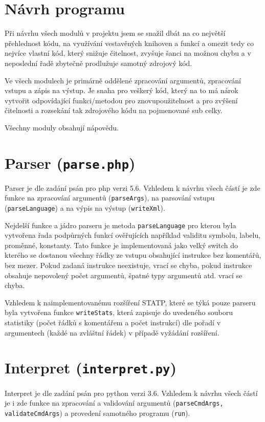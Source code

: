 \documentclass[a4paper,10pt]{article}
\begin{document}
\hfill

\section*{Návrh programu}
  Při návrhu všech modulů v projektu jsem se snažil dbát na co největší přehlednost kódu, na
  využívání vestavěných knihoven a funkcí a omezit tedy co nejvíce vlastní kód, který snižuje
  čitelnost, zvyšuje šanci na možnou chybu a v neposlední řadě zbytečně prodlužuje samotný zdrojový kód.

  Ve všech modulech je primárně oddělené zpracování argumentů, zpracování vstupu a zápis na výstup.
  Je snaha pro veškerý kód, který na to má nárok vytvořit odpovídající funkci/metodou pro
  znovupoužitelnost a pro zvýšení čitelnosti a rozsekání tak zdrojového kódu na pojmenované sub celky.

  Všechny moduly obsahují nápovědu.

\section{Parser (\texttt{parse.php})}
  Parser je dle zadání psán pro php verzi 5.6. Vzhledem k návrhu všech částí je zde funkce na zpracování argumentů (\texttt{parseArgs}), na parsování vstupu (\texttt{parseLanguage}) a na výpis na výstup (\texttt{writeXml}).

  Nejdelší funkce a jádro parseru je metoda \texttt{parseLanguage} pro kterou byla vytvořena řada podpůrných funkcí ověřujících například validitu symbolu, labelu, proměnné, konstanty.
  Tato funkce je implementovaná jako velký switch do kterého se dostanou všechny řádky ze vstupu obsahující instrukce bez komentářů, bez mezer. Pokud zadaná instrukce neexistuje, vrací se chyba, pokud instrukce obsahuje nepovolený počet argumentů, špatné typy argumentů atd. vrací se chyba.

  Vzhledem k naimplementovanému rozšíření STATP, které se týká pouze parseru byla vytvořena funkce \texttt{writeStats}, která zapisuje do uvedeného souboru statistiky (počet řádků s komentářem a počet instrukcí) dle pořadí v argumentech (každé na zvláštní řádek) v případě vyžádání rozšíření.

\section{Interpret (\texttt{interpret.py})}
  Interpret je dle zadání psán pro python verzi 3.6. Vzhledem k návrhu všech částí je i zde funkce na zpracování a validování argumentů (\texttt{parseCmdArgs, validateCmdArgs}) a provedení samotného programu (\texttt{run}).
\end{document}
